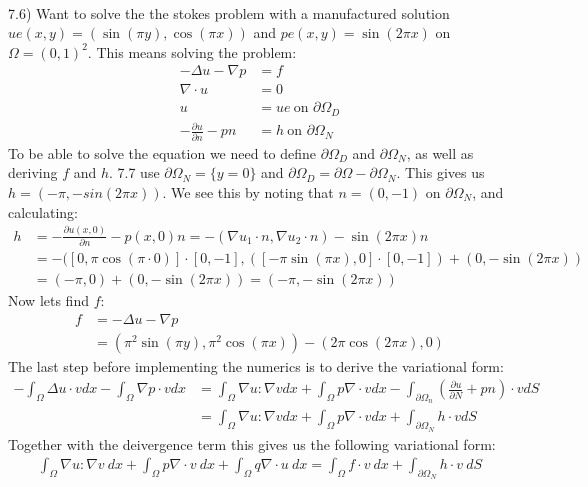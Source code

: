 \documentclass[11pt,a4paper]{report}
\begin{document}
\\
7.6) Want to solve the the stokes problem with a manufactured solution $ue(x,y)=(\sin(\pi y),\cos(\pi x))$ and $pe(x,y)=\sin(2\pi x)$ on $\Omega = (0,1)^2$. This means solving the problem:
\begin{align*}
-\Delta u - \nabla p &= f \\
\nabla \cdot u &= 0 \\
u &= ue \ \text{on } \partial\Omega_D \\
-\frac{\partial u}{\partial n} - pn &= h \ \text{on } \partial\Omega_N
\end{align*} 
To be able to solve the equation we need to define $\partial\Omega_D$ and $\partial\Omega_N$, as well as deriving $f$ and $h$. 7.7 use $\partial\Omega_N= \{y=0\}$ and $\partial\Omega_D=\partial\Omega - \partial\Omega_N$. This gives us $h=(-\pi,-sin(2\pi x))$. We see this by noting that $n=(0,-1)$ on $\partial\Omega_N$, and calculating:
\begin{align*}
h &= -\frac{\partial u(x,0)}{\partial n} - p(x,0)n  = -(\nabla u_1\cdot n,\nabla u_2\cdot n) -\sin(2\pi x)n\\
&= -( [0,\pi \cos(\pi \cdot0)] \cdot[0,-1], ( [-\pi \sin(\pi x),0]\cdot[0,-1]) +(0,-\sin(2\pi x)) \\
& = (-\pi,0)+(0,-\sin(2\pi x)) = (-\pi,-\sin(2\pi x))
\end{align*}
Now lets find $f$:
\begin{align*}
f &= -\Delta u - \nabla p \\
&= (\pi^2 \sin(\pi y),\pi^2 \cos(\pi x)) - (2\pi\cos(2\pi x),0) 
\end{align*} 
The last step before implementing the numerics is to derive the variational form:
\begin{align*}
-\int_{\Omega} \Delta u \cdot v  dx - \int_{\Omega} \nabla p \cdot v  dx &= \int_{\Omega} \nabla u :\nabla v  dx + \int_{\Omega} p \nabla\cdot v  dx -\int_{\partial\Omega_n}(\frac{\partial u}{\partial N} + pn)\cdot v  dS \\
&=\int_{\Omega} \nabla u :\nabla v  dx + \int_{\Omega} p \nabla\cdot v  dx +\int_{\partial\Omega_N}h\cdot v  dS 
\end{align*}
Together with the deivergence term this gives us the following variational form:
\begin{align*}
\int_{\Omega} \nabla u :\nabla v \ dx + \int_{\Omega} p \nabla\cdot v \ dx +\int_{\Omega} q\nabla\cdot u  \ dx = \int_{\Omega} f\cdot v \ dx +\int_{\partial\Omega_N}h\cdot v \ dS 
\end{align*}
\end{document}
